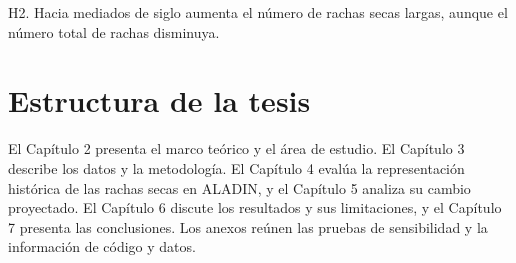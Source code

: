 H2. Hacia mediados de siglo aumenta el número de rachas secas largas, aunque el número total de rachas disminuya.


\section{Estructura de la tesis}\label{sec:estructura}

El Capítulo 2 presenta el marco teórico y el área de estudio. El Capítulo 3 describe los datos y la metodología. El Capítulo 4 evalúa la representación histórica de las rachas secas en ALADIN, y el Capítulo 5 analiza su cambio proyectado. El Capítulo 6 discute los resultados y sus limitaciones, y el Capítulo 7 presenta las conclusiones. Los anexos reúnen las pruebas de sensibilidad y la información de código y datos.
